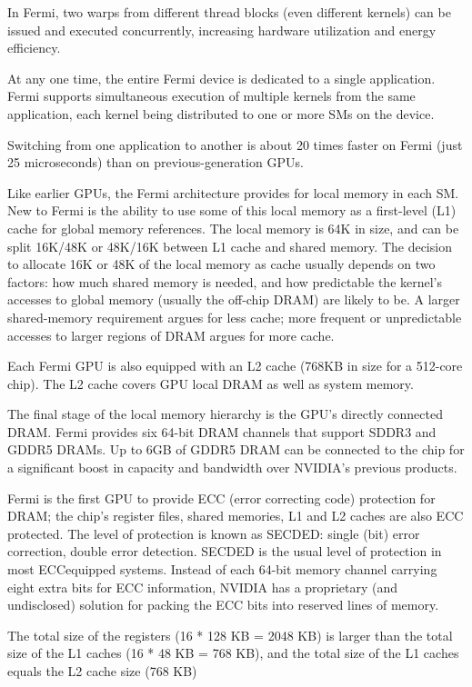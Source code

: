 In Fermi, two warps from different thread blocks (even different
kernels) can be issued and executed concurrently, increasing hardware
utilization and energy efficiency.

At any one time, the entire Fermi device is dedicated to a single
application. Fermi supports simultaneous execution of multiple kernels
from the same application, each kernel being distributed to one or
more SMs on the device.

Switching from one application to another is about 20 times faster on
Fermi (just 25 microseconds) than on previous-generation GPUs.


Like earlier GPUs, the Fermi architecture provides for local memory in
each SM.  New to Fermi is the ability to use some of this local memory
as a first-level (L1) cache for global memory references. The local
memory is 64K in size, and can be split 16K/48K or 48K/16K between L1
cache and shared memory.  The decision to allocate 16K or 48K of the
local memory as cache usually depends on two factors: how much shared
memory is needed, and how predictable the kernel's accesses to global
memory (usually the off-chip DRAM) are likely to be.
A larger shared-memory requirement argues for less cache; more frequent or
unpredictable accesses to larger regions of DRAM argues for more
cache.


Each Fermi GPU is also equipped with an L2 cache (768KB in size for a
512-core chip). The L2 cache covers GPU local DRAM as well as system
memory.


The final stage of the local memory hierarchy is the GPU's directly
connected DRAM. Fermi provides six 64-bit DRAM channels that support
SDDR3 and GDDR5 DRAMs. Up to 6GB of GDDR5 DRAM can be connected to the
chip for a significant boost in capacity and bandwidth over NVIDIA's
previous products.

Fermi is the first GPU to provide ECC (error correcting code)
protection for DRAM; the chip's register files, shared memories, L1
and L2 caches are also ECC protected. The level of protection is known
as SECDED: single (bit) error correction, double error
detection. SECDED is the usual level of protection in most ECCequipped
systems. Instead of each 64-bit memory channel carrying eight extra
bits for ECC information, NVIDIA has a proprietary (and undisclosed)
solution for packing the ECC bits into reserved lines of memory.

The total size of the registers (16 * 128 KB = 2048 KB) is larger than
the total size of the L1 caches (16 * 48 KB = 768 KB), and the total
size of the L1 caches equals the L2 cache size (768 KB)


